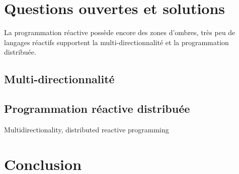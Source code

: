 \documentclass[10pt,final]{IEEEtran}
\begin{document}
\section{Questions ouvertes et solutions}

La programmation réactive possède encore des zones d'ombres, très peu de langages réactifs
supportent la multi-directionnalité et la programmation distribuée.

\subsection{Multi-directionnalité}

\subsection{Programmation réactive distribuée}


Multidirectionality, distributed reactive programming 

\section{Conclusion}
\end{document}
